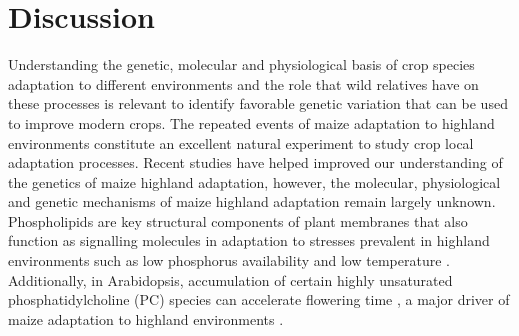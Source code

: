 \documentclass[9pt,twocolumn,twoside,lineno]{BioRxiv}
\begin{document}
\section{Discussion}
\label{sec:discussion}
Understanding the genetic, molecular and  physiological basis of crop species adaptation to different environments and the role that wild relatives have on these processes is relevant to identify favorable genetic variation that can be used to improve modern crops.
The repeated events of maize adaptation to highland environments constitute an excellent natural experiment to study crop local adaptation processes. 
Recent studies \cite{Wang2020-mp, Takuno2015-uj, Crow2020-gene} have helped improved our understanding of the genetics of maize highland adaptation, however, the molecular, physiological and genetic mechanisms of maize highland adaptation remain largely unknown.
Phospholipids are key structural components of plant membranes that also function as signalling molecules in adaptation to stresses prevalent in highland environments \cite{Ryu2004-iv, Nakamura2017-vb} such as low phosphorus availability \cite{Veneklaas2012-ls, Cruz-Ramirez2004-ib, Lambers2012-an} and low temperature \cite{Degenkolbe2012-wf, Welti2002-uk, Marla2017-ph}. 
Additionally, in Arabidopsis, accumulation of certain highly unsaturated phosphatidylcholine (PC) species can accelerate flowering time \cite{Nakamura2014-qf}, a major driver of maize adaptation to highland environments \cite{Romero_Navarro2017-cn, Gates2019-xu}.
 
\end{document}
